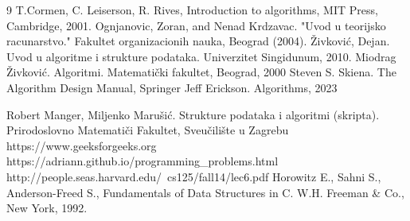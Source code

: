 \documentclass[b5paper, utf8, 11pt, colorlinks]{book}
\begin{document}



 


\backmatter
\begin{thebibliography}{9}
	T.Cormen, C. Leiserson, R. Rives, Introduction to algorithms, MIT Press, Cambridge, 2001.
	Ognjanovic, Zoran, and Nenad Krdzavac. "Uvod u teorijsko racunarstvo." Fakultet organizacionih nauka, Beograd (2004).
	Živković, Dejan. Uvod u algoritme i strukture podataka. Univerzitet Singidunum, 2010.
    Miodrag Živković. Algoritmi. Matematički fakultet, Beograd, 2000
    Steven S. Skiena. The Algorithm Design Manual, Springer
     Jeff Erickson. Algorithms, 2023
    
     Robert Manger, Miljenko Marušić. Strukture podataka i algoritmi (skripta).
    Prirodoslovno Matematiči Fakultet, Sveučilište u Zagrebu
    https://www.geeksforgeeks.org
      {https://adriann.github.io/programming\_problems.html}
    http://people.seas.harvard.edu/~cs125/fall14/lec6.pdf
     Horowitz E., Sahni S., Anderson-Freed S., Fundamentals of Data Structures in C. W.H. Freeman \& Co., New York, 1992.
\end{thebibliography}
\end{document}
